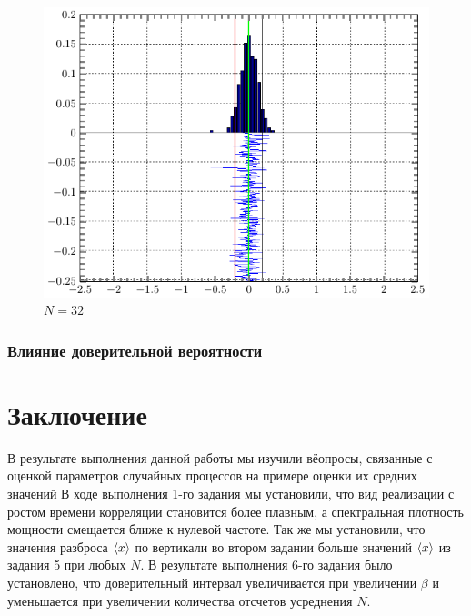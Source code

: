 \documentclass[a4paper,14pt]{extarticle}
\begin{document}
\begin{figure}[H]
    \centering
    \includegraphics[width=0.75\linewidth]{fig/gist_n32}
    \vspace{-0.7em}
    \caption{$N=32$}
    \label{fig:g32}
\end{figure}
\subsubsection{Влияние доверительной вероятности}



\section*{Заключение}

В результате выполнения данной работы мы изучили вёопросы, связанные с оценкой параметров случайных процессов на примере оценки их средних значений
В ходе выполнения 1-го задания мы установили, что вид реализации с ростом времени корреляции становится более плавным, а спектральная плотность мощности смещается ближе к нулевой частоте.
Так же мы установили, что значения разброса $\langle x\rangle$ по вертикали во втором задании больше значений $\langle x\rangle$ из задания 5 при любых $N$.
В результате выполнения 6-го задания было установлено, что доверительный интервал увеличивается при увеличении $\beta$ и уменьшается при увеличении количества отсчетов усреднения $N$.
\end{document}
